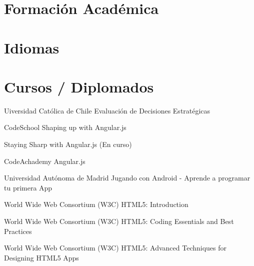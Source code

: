 \documentclass[]{cvStyle1}
\begin{document}
    \section*{Formaci\'on Acad\'emica}
        
    \section*{Idiomas}
        
    
        
        
        
        
        
        
        
        
    \section*{Cursos / Diplomados}
        \skill
			{Uiversidad Cat\'olica de Chile}
			{Evaluaci\'on de Decisiones Estrat\'egicas}
              
        \skill
			{CodeSchool}
			{Shaping up with Angular.js}
        
        \skill
			{}
			{Staying Sharp with Angular.js (En curso)}
        
        \skill
			{CodeAchademy}
			{Angular.js}
        
        \skill
			{Universidad Aut\'onoma de Madrid}
			{Jugando con Android - Aprende a programar tu primera App}
        
        \skill
			{World Wide Web Consortium (W3C)}
			{HTML5: Introduction}
        
        \skill
			{World Wide Web Consortium (W3C)}
            {HTML5: Coding Essentials and Best Practices}
            
        \skill
			{World Wide Web Consortium (W3C)}
			{HTML5: Advanced Techniques for Designing HTML5 Apps}
            
\end{document}
